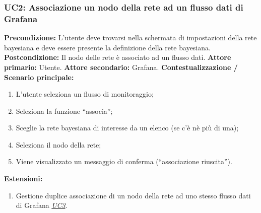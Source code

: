                 \subsubsection{UC2: Associazione un nodo della rete ad un flusso dati di Grafana}
                    \textbf{Precondizione:}   L’utente deve trovarsi nella schermata di impostazioni della rete bayesiana e deve essere presente la definizione della rete bayesiana.
                    \newline
                    \textbf{Postcondizione:} Il nodo delle rete è associato ad un flusso dati.
                    \newline
                    \textbf{Attore primario:} Utente.
                    \newline
                    \textbf{Attore secondario:} Grafana.
                    \newline
                    \textbf{Contestualizzazione / Scenario principale:} \begin{enumerate}
                        \item L’utente seleziona un flusso di monitoraggio;
                        \item Seleziona la funzione “associa”;
                        \item Sceglie la rete bayesiana di interesse da un elenco (se c’è nè più di una);
                        \item Seleziona il nodo della rete;
                        \item Viene visualizzato un messaggio di conferma (“associazione riuscita”).
                    \end{enumerate}
                    
                    \textbf{Estensioni:} \begin{enumerate}
                            \item Gestione duplice associazione di un nodo della rete ad uno stesso flusso dati di Grafana \underline{\textit{UC3}}.
                        \end{enumerate}
                

